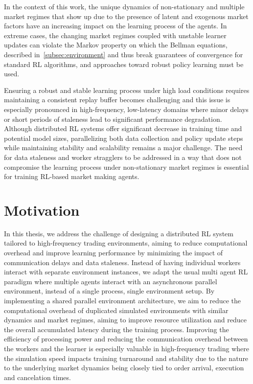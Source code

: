 In the context of this work, the unique dynamics of non-stationary and multiple market regimes that show up
due to the presence of latent and exogenous market factors have an increasing impact on the learning process of the agents.
In extreme cases, the changing market regimes coupled with unstable learner updates can violate the Markov property
on which the Bellman equations, described in~\autoref{subsec:environment} and thus break guarantees of convergence for standard RL algorithms,
and approaches toward robust policy learning must be used.

Ensuring a robust and stable learning process under high load conditions requires maintaining a consistent replay buffer
becomes challenging and this issue is especially pronounced in high-frequency,
low-latency domains where minor delays or short periods of staleness lead to significant performance degradation.
Although distributed RL systems offer significant decrease in training time and potential model sizes,
parallelizing both data collection and policy update steps while maintaining stability and scalability remains a major challenge.
The need for data staleness and worker stragglers to be addressed in a way that does not compromise the learning process
under non-stationary market regimes is essential for training RL-based market making agents.


\section{Motivation}
\label{sec:motivation}

In this thesis, we address the challenge of designing a distributed RL system tailored to high-frequency trading environments,
aiming to reduce computational overhead and improve learning performance by minimizing the impact of communication delays and data staleness.
Instead of having individual workers interact with separate environment instances, we adapt the usual multi agent RL paradigm
where multiple agents interact with an asynchronous parallel environment, instead of a single process, single environment setup.
By implementing a shared parallel environment architecture, we aim to reduce the computational overhead of duplicated
simulated environments with similar dynamics and market regimes, aiming to improve resource utilization and reduce the overall
accumulated latency during the training process.
Improving the efficiency of processing power and reducing the communication overhead between the workers and the learner is
especially valuable in high-frequency trading where the simulation speed impacts training turnaround and stability
due to the nature to the underlying market dynamics being closely tied to order arrival, execution and cancelation times.

